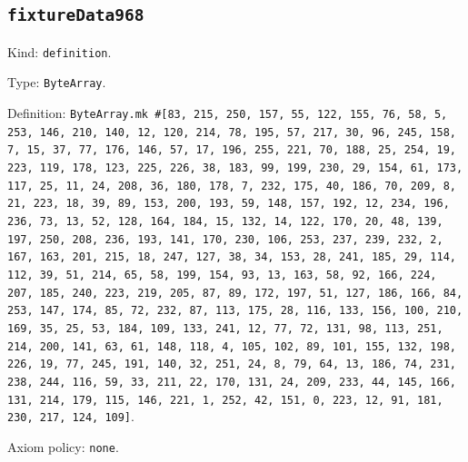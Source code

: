 \documentclass[11pt]{article}
\begin{document}
\subsection*{\texttt{fixtureData968}}
\noindent Kind: \texttt{definition}.\par
\noindent Type: \texttt{ByteArray}.\par
\noindent Definition: \texttt{ByteArray.mk \#[83, 215, 250, 157, 55, 122, 155, 76, 58, 5, 253, 146, 210, 140, 12, 120, 214, 78, 195, 57, 217, 30, 96, 245, 158, 7, 15, 37, 77, 176, 146, 57, 17, 196, 255, 221, 70, 188, 25, 254, 19, 223, 119, 178, 123, 225, 226, 38, 183, 99, 199, 230, 29, 154, 61, 173, 117, 25, 11, 24, 208, 36, 180, 178, 7, 232, 175, 40, 186, 70, 209, 8, 21, 223, 18, 39, 89, 153, 200, 193, 59, 148, 157, 192, 12, 234, 196, 236, 73, 13, 52, 128, 164, 184, 15, 132, 14, 122, 170, 20, 48, 139, 197, 250, 208, 236, 193, 141, 170, 230, 106, 253, 237, 239, 232, 2, 167, 163, 201, 215, 18, 247, 127, 38, 34, 153, 28, 241, 185, 29, 114, 112, 39, 51, 214, 65, 58, 199, 154, 93, 13, 163, 58, 92, 166, 224, 207, 185, 240, 223, 219, 205, 87, 89, 172, 197, 51, 127, 186, 166, 84, 253, 147, 174, 85, 72, 232, 87, 113, 175, 28, 116, 133, 156, 100, 210, 169, 35, 25, 53, 184, 109, 133, 241, 12, 77, 72, 131, 98, 113, 251, 214, 200, 141, 63, 61, 148, 118, 4, 105, 102, 89, 101, 155, 132, 198, 226, 19, 77, 245, 191, 140, 32, 251, 24, 8, 79, 64, 13, 186, 74, 231, 238, 244, 116, 59, 33, 211, 22, 170, 131, 24, 209, 233, 44, 145, 166, 131, 214, 179, 115, 146, 221, 1, 252, 42, 151, 0, 223, 12, 91, 181, 230, 217, 124, 109]}.\par
\noindent Axiom policy: \texttt{none}.\par
\end{document}
